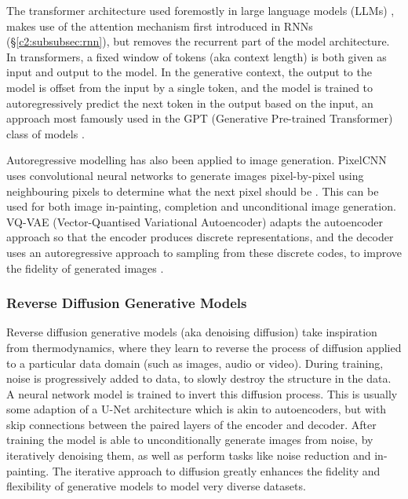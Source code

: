 The transformer architecture used foremostly in large language models (LLMs) \citep{vaswani2017attention}, makes use of the attention mechanism first introduced in RNNs \citep{bahdanau2014neural} (\S \ref{c2:subsubsec:rnn}), but removes the recurrent part of the model architecture.
In transformers, a fixed window of tokens (aka context length) is both given as input and output to the model.
In the generative context, the output to the model is offset from the input by a single token, and the model is trained to autoregressively predict the next token in the output based on the input, an approach most famously used in the GPT (Generative Pre-trained Transformer) class of models \citep{radford2018improving, radford2019language,brown2020language}.

Autoregressive modelling has also been applied to image generation.
PixelCNN uses convolutional neural networks to generate images pixel-by-pixel using neighbouring pixels to determine what the next pixel should be \citep{van2016conditional}.
This can be used for both image in-painting, completion and unconditional image generation.
VQ-VAE (Vector-Quantised Variational Autoencoder) adapts the autoencoder approach so that the encoder produces discrete representations, and the decoder uses an autoregressive approach to sampling from these discrete codes, to improve the fidelity of generated images \citep{van2017neural}. 

\subsubsection{Reverse Diffusion Generative Models}
\label{c2:subsubsec:diffusion}

Reverse diffusion generative models (aka denoising diffusion) take inspiration from thermodynamics, where they learn to reverse the process of diffusion applied to a particular data domain \citep{sohl2015deep} (such as images, audio or video). 
During training, noise is progressively added to data, to slowly destroy the structure in the data.
A neural network model is trained to invert this diffusion process. This is usually some adaption of a U-Net architecture \citep{ronneberger2015u} which is akin to autoencoders, but with skip connections between the paired layers of the encoder and decoder.
After training the model is able to unconditionally generate images from noise, by iteratively denoising them, as well as perform tasks like noise reduction and in-painting. 
The iterative approach to diffusion greatly enhances the fidelity and flexibility of generative models to model very diverse datasets.

